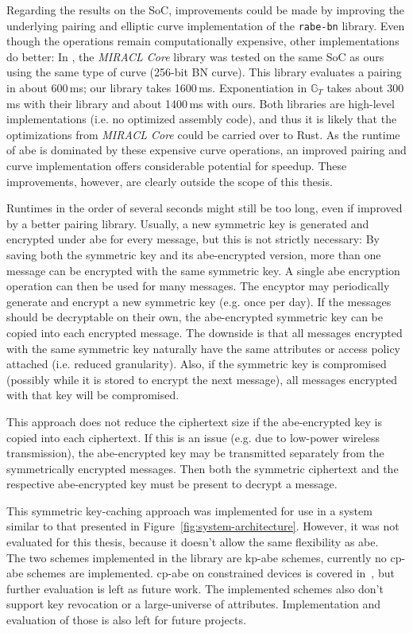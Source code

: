 Regarding the results on the SoC, improvements could be made by improving the underlying pairing and elliptic curve implementation of the \texttt{rabe-bn} library.
Even though the operations remain computationally expensive, other implementations do better:
In \cite{scott_deployment_2020}, the \emph{MIRACL Core} library was tested on the same SoC as ours using the same type of curve (256-bit BN curve).
This library evaluates a pairing in about 600\,ms; our library takes 1600\,ms. 
Exponentiation in $\mathbb{G}_T$ takes about 300\,ms with their library and about 1400\,ms with ours. 
Both libraries are high-level implementations (i.e. no optimized assembly code), and thus it is likely that the optimizations from \emph{MIRACL Core} could be carried over to Rust.
As the runtime of \acrshort{abe} is dominated by these expensive curve operations, an improved pairing and curve implementation offers considerable potential for speedup.
These improvements, however, are clearly outside the scope of this thesis.

Runtimes in the order of several seconds might still be too long, even if improved by a better pairing library.
Usually, a new symmetric key is generated and encrypted under \acrshort{abe} for every message, but this is not strictly necessary:
By saving both the symmetric key and its \acrshort{abe}-encrypted version, more than one message can be encrypted with the same symmetric key.
A single \acrshort{abe} encryption operation can then be used for many messages.
The encyptor may periodically generate and encrypt a new symmetric key (e.g. once per day).
If the messages should be decryptable on their own, the \acrshort{abe}-encrypted symmetric key can be copied into each encrypted message.
The downside is that all messages encrypted with the same symmetric key naturally have the same attributes or access policy attached (i.e. reduced granularity).
Also, if the symmetric key is compromised (possibly while it is stored to encrypt the next message), all messages encrypted with that key will be compromised.

This approach does not reduce the ciphertext size if the \acrshort{abe}-encrypted key is copied into each ciphertext.
If this is an issue (e.g. due to low-power wireless transmission), the \acrshort{abe}-encrypted key may be transmitted separately from the symmetrically encrypted messages.
Then both the symmetric ciphertext and the respective \acrshort{abe}-encrypted key must be present to decrypt a message.

This symmetric key-caching approach was implemented for use in a system similar to that presented in Figure~\ref{fig:system-architecture}.
However, it was not evaluated for this thesis, because it doesn't allow the same flexibility as \acrlong{abe}.
~\\

The two schemes implemented in the library are \acrshort{kp-abe} schemes, currently no \acrshort{cp-abe} schemes are implemented.
\acrshort{cp-abe} on constrained devices is covered in~\cite{borgh_attribute-based_2016}, but further evaluation is left as future work.
The implemented schemes also don't support key revocation or a \gls{large-universe} of attributes. 
Implementation and evaluation of those is also left for future projects.
